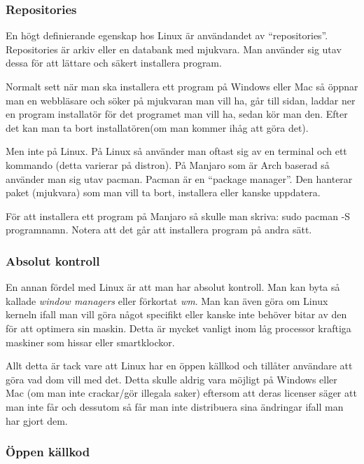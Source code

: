 \documentclass[12pt, a4paper]{report}
\begin{document}
   \subsubsection{Repositories}

    En högt definierande egenskap hos Linux är användandet av ``repositories''. Repositories är arkiv eller en databank med mjukvara. Man använder sig utav dessa för att lättare och säkert installera program.

    Normalt sett när man ska installera ett program på Windows eller Mac så öppnar man en webbläsare och söker på mjukvaran man vill ha, går till sidan, laddar ner en program installatör för det programet man vill ha, sedan kör man den. Efter det kan man ta bort installatören(om man kommer ihåg att göra det).
    
    Men inte på Linux. På Linux så använder man oftast sig av en terminal och ett kommando (detta varierar på distron).
    På Manjaro som är Arch baserad så använder man sig utav pacman\cite{pacman}. Pacman är en ``package manager''\cite{pkgmanager}. Den hanterar paket (mjukvara) som man vill ta bort, installera eller kanske uppdatera.

    För att installera ett program på Manjaro så skulle man skriva: sudo pacman -S programnamn. Notera att det går att installera program på andra sätt.


    \subsubsection{Absolut kontroll}

   En annan fördel med Linux är att man har absolut kontroll. Man kan byta så kallade \textit{window managers} eller förkortat \textit{wm}\cite{wm}. Man kan även göra om Linux kerneln ifall man vill göra något specifikt eller kanske inte behöver bitar av den för att optimera sin maskin. Detta är mycket vanligt inom låg processor kraftiga maskiner som hissar eller smartklockor.

   Allt detta är tack vare att Linux har en öppen källkod och tillåter användare att göra vad dom vill med det. Detta skulle aldrig vara möjligt på Windows eller Mac (om man inte crackar/gör illegala saker) eftersom att deras licenser säger att man inte får och dessutom så får man inte distribuera sina ändringar ifall man har gjort dem.

   \subsubsection{Öppen källkod}
\end{document}
